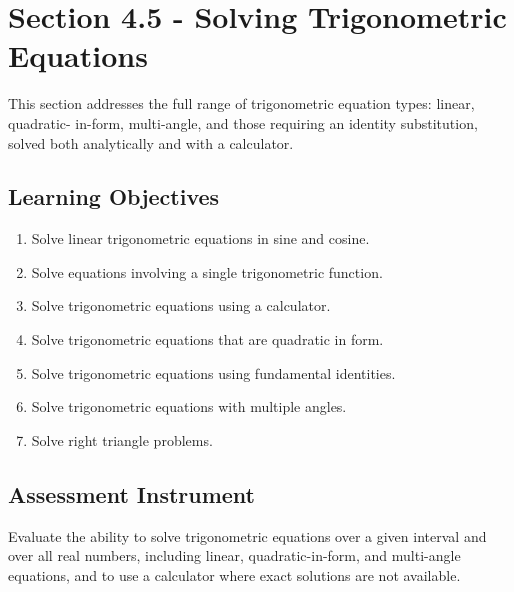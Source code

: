 \section{Section 4.5 - Solving Trigonometric Equations}
\label{sec:sect-8eb2}

This section addresses the full range of trigonometric equation types: linear, quadratic-
in-form, multi-angle, and those requiring an identity substitution, solved both
analytically and with a calculator.

\subsection{Learning Objectives}
\label{ssec:lear-fe6e}

\begin{enumerate}
    \item Solve linear trigonometric equations in sine and cosine.
    \item Solve equations involving a single trigonometric function.
    \item Solve trigonometric equations using a calculator.
    \item Solve trigonometric equations that are quadratic in form.
    \item Solve trigonometric equations using fundamental identities.
    \item Solve trigonometric equations with multiple angles.
    \item Solve right triangle problems.
\end{enumerate}

\subsection{Assessment Instrument}
\label{ssec:asse-3669}

Evaluate the ability to solve trigonometric equations over a given interval and over all
real numbers, including linear, quadratic-in-form, and multi-angle equations, and to use a
calculator where exact solutions are not available.

